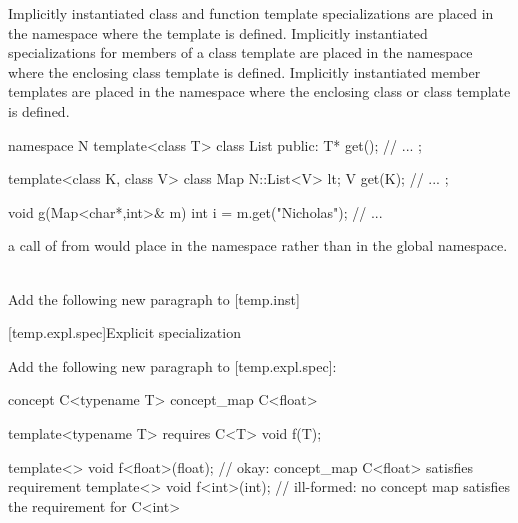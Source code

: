 \documentclass[american]{book}
\newcommand{\editorial}[1]{\colorbox{editbackground}{\begin{minipage}{\linewidth
}#1\end{minipage}}}
\begin{document}
\begin{paras}
\pnum
Implicitly instantiated class and function template specializations are placed
in the namespace where the template is defined.
Implicitly instantiated specializations for members of a class template are
placed in the namespace \textcolor{black}{}where the enclosing class template is defined.
Implicitly instantiated member templates are placed in the namespace where the
enclosing class or class template is defined.
\enterexample\ 

\begin{codeblock}
namespace N {
  template<class T> class List {
  public:
    T* get();
  // ...
  };
}

template<class K, class V> class Map {
  N::List<V> lt;
  V get(K);
  // ...
};

void g(Map<char*,int>& m)
{
  int i = m.get("Nicholas");
  // ...
}
\end{codeblock}

a call of
from
would place
in the namespace
rather than in the global namespace.
\exitexample\ 

\noindent\editorial{Add the following new paragraph to [temp.inst]}
\setcounter{Paras}{14}
\pnum
{}

[temp.expl.spec]{Explicit specialization}

\noindent\editorial{Add the following new paragraph to [temp.expl.spec]:}

\setcounter{Paras}{22}
\color{addclr}
\pnum
{}
\begin{codeblock}
concept C<typename T> { }
concept_map C<float> { }

template<typename T> requires C<T> void f(T);

template<> void f<float>(float); // okay: concept_map C<float> satisfies requirement
template<> void f<int>(int); // ill-formed: no concept map satisfies the requirement for C<int>
\end{codeblock}
\addedConcepts{\mbox{\exitexample} \mbox{\exitnote}}
\color{black}


\end{paras}
\end{document}
